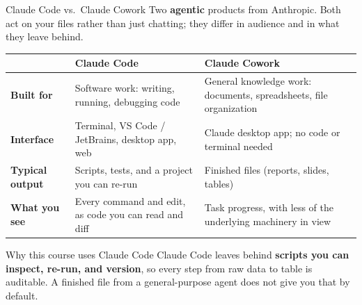 \documentclass[aspectratio=169, 11pt]{beamer}
\begin{document}
\begin{frame}{Claude Code vs.\ Claude Cowork}
  \small
  Two \textbf{agentic} products from Anthropic. Both act on your files rather than just chatting; they differ in audience and in what they leave behind.

  \vspace{0.4em}
  \begin{tabular}{@{}p{} p{} p{}@{}}
    \toprule
     & \textbf{Claude Code} & \textbf{Claude Cowork} \\
    \midrule
    \textbf{Built for} & Software work: writing, running, debugging code & General knowledge work: documents, spreadsheets, file organization \\[0.3em]
    \textbf{Interface} & Terminal, VS Code / JetBrains, desktop app, web & Claude desktop app; no code or terminal needed \\[0.3em]
    \textbf{Typical output} & Scripts, tests, and a project you can re-run & Finished files (reports, slides, tables) \\[0.3em]
    \textbf{What you see} & Every command and edit, as code you can read and diff & Task progress, with less of the underlying machinery in view \\
    \bottomrule
  \end{tabular}

  \vspace{0.5em}
  \begin{alertblock}{Why this course uses Claude Code}
    Claude Code leaves behind \textbf{scripts you can inspect, re-run, and version}, so every step from raw data to table is auditable. A finished file from a general-purpose agent does not give you that by default.
  \end{alertblock}
\end{frame}

\end{document}
